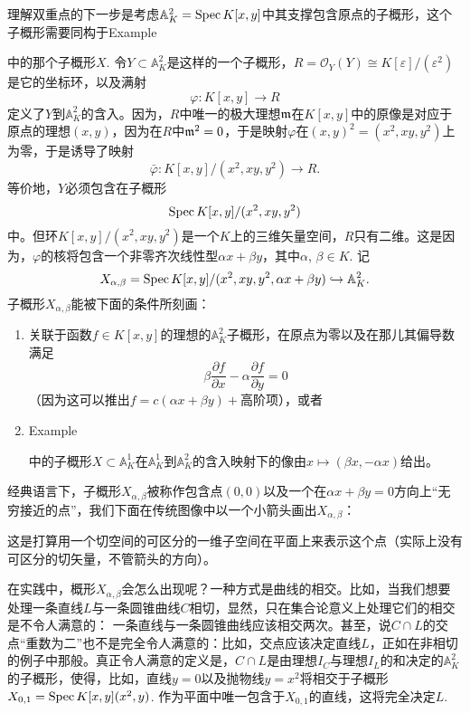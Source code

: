 \begin{exa}[双重点]
理解双重点的下一步是考虑$\mathbb{A}_K^2=\operatorname{Spec} K[x,y]$中其支撑包含原点的子概形，这个子概形需要同构于Example {{\addtocounter{thm}{-1}}\thethm{\addtocounter{thm}{1}}}中的那个子概形$X$. 令$Y\subset \mathbb{A}_K^2$是这样的一个子概形，$R=\mathscr{O}_Y(Y)\cong K[\varepsilon]/(\varepsilon^2)$是它的坐标环，以及满射
\[
	\varphi:K[x,y]\to R
\]
定义了$Y$到$\mathbb{A}_K^2$的含入。因为，$R$中唯一的极大理想$\mathfrak{m}$在$K[x,y]$中的原像是对应于原点的理想$(x,y)$，因为在$R$中$\mathfrak{m}^2=0$，于是映射$\varphi$在$(x,y)^2=(x^2,xy,y^2)$上为零，于是诱导了映射
\[
	\bar\varphi:K[x,y]/(x^2,xy,y^2)\to R.
\]
等价地，$Y$必须包含在子概形
\[
	\operatorname{Spec} K[x,y]/(x^2,xy,y^2)
\]
中。但环$K[x,y]/(x^2,xy,y^2)$是一个$K$上的三维矢量空间，$R$只有二维。这是因为，$\varphi$的核将包含一个非零齐次线性型$\alpha x+\beta y$，其中$\alpha$, $\beta\in K$. 记
\[
	X_{\alpha,\beta}=\operatorname{Spec} K[x,y]/(x^2,xy,y^2,\alpha x+\beta y)\hookrightarrow \mathbb{A}_K^2.
\]
子概形$X_{\alpha,\beta}$能被下面的条件所刻画：

\begin{enumerate}[{(i)}]\setlength{\itemsep}{0pt}
\item 关联于函数$f\in K[x,y]$的理想的$\mathbb{A}^2_K$子概形，在原点为零以及在那儿其偏导数满足
\[
	\beta\frac{\partial f}{\partial x}-\alpha\frac{\partial f}{\partial y}=0
\]
（因为这可以推出$f=c(\alpha x+\beta y)+$高阶项），或者
\item Example {{\addtocounter{thm}{-1}}\thethm{\addtocounter{thm}{1}}}中的子概形$X\subset \mathbb{A}_K^1$在$\mathbb{A}_K^1$到$\mathbb{A}_K^2$的含入映射下的像由$x\mapsto (\beta x,-\alpha x)$给出。
\end{enumerate}

经典语言下，子概形$X_{\alpha,\beta}$被称作包含点$(0,0)$以及一个在$\alpha x+\beta y=0$方向上“无穷接近的点”，我们下面在传统图像中以一个小箭头画出$X_{\alpha,\beta}$：


\noindent 这是打算用一个切空间的可区分的一维子空间在平面上来表示这个点（实际上没有可区分的切矢量，不管箭头的方向）。\nottran
\end{exa}

在实践中，概形$X_{\alpha,\beta}$会怎么出现呢？一种方式是曲线的相交。比如，当我们想要处理一条直线$L$与一条圆锥曲线$C$相切，显然，只在集合论意义上处理它们的相交是不令人满意的：
一条直线与一条圆锥曲线应该相交两次。甚至，说$C\cap L$的交点“重数为二”也不是完全令人满意的：比如，交点应该决定直线$L$，正如在非相切的例子中那般。真正令人满意的定义是，$C\cap L$是由理想$I_C$与理想$I_L$的和决定的$\mathbb{A}_K^2$的子概形，使得，比如，直线$y=0$以及抛物线$y=x^2$将相交于子概形$X_{0,1}=\operatorname{Spec} K[x,y](x^2,y)$. 作为平面中唯一包含于$X_{0,1}$的直线，这将完全决定$L$. 


